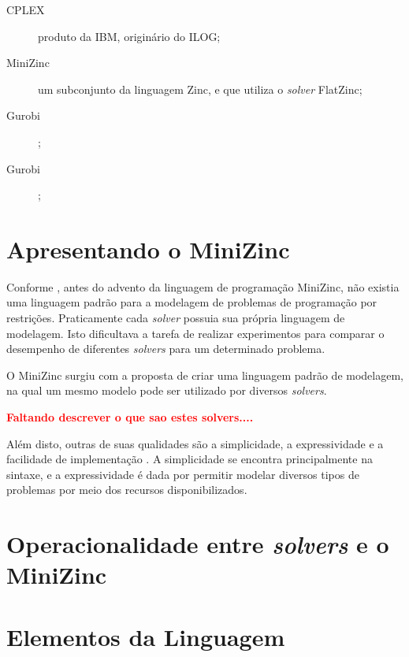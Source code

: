 \begin{description}
  \item[CPLEX] produto da IBM, originário do ILOG;
  
    \item[MiniZinc] um subconjunto da linguagem Zinc, e que
    utiliza o \textit{solver} FlatZinc;
  
   \item[Gurobi] ;
  
   \item[Gurobi] ;
    
\end{description}











\section{Apresentando o MiniZinc}
\label{sc:minizinc}

Conforme \cite{mzntwds}, antes do advento da linguagem de programação MiniZinc, não existia uma linguagem padrão para a modelagem de problemas de programação por restrições. Praticamente cada \textit{solver} possuia sua própria linguagem de modelagem. Isto dificultava a tarefa de realizar experimentos para comparar o desempenho de diferentes \textit{solvers} para um determinado problema.

O MiniZinc surgiu com a proposta de criar uma linguagem padrão de modelagem, na qual um mesmo modelo pode ser utilizado por diversos \textit{solvers}. 

{\bf \textcolor{red}{Faltando descrever o que sao estes solvers....}}


Além disto, outras de suas qualidades são a simplicidade, a expressividade e a facilidade de implementação \cite{mzntwds}. A simplicidade se encontra principalmente na sintaxe, e a expressividade é dada por permitir modelar diversos tipos de problemas por meio dos recursos disponibilizados.

\section{Operacionalidade entre \textit{solvers} e o MiniZinc}


\section{Elementos da Linguagem}


